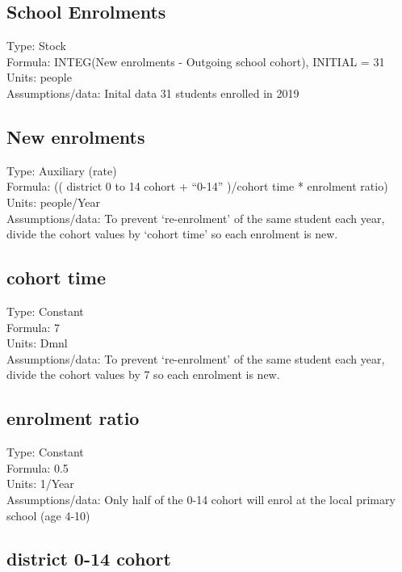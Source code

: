 \documentclass[
  11pt,
]{book}
\begin{document}
\hypertarget{school-enrolments}{%
\subsection{School Enrolments}\label{school-enrolments}}

Type: Stock\\
Formula: INTEG(New enrolments - Outgoing school cohort), INITIAL = 31\\
Units: people\\
Assumptions/data: Inital data 31 students enrolled in 2019

\hypertarget{new-enrolments}{%
\subsection{New enrolments}\label{new-enrolments}}

Type: Auxiliary (rate)\\
Formula: (( district 0 to 14 cohort + ``0-14'' )/cohort time * enrolment ratio)\\
Units: people/Year\\
Assumptions/data: To prevent `re-enrolment' of the same student each year, divide the cohort values by `cohort time' so each enrolment is new.

\hypertarget{cohort-time}{%
\subsection{cohort time}\label{cohort-time}}

Type: Constant\\
Formula: 7\\
Units: Dmnl\\
Assumptions/data: To prevent `re-enrolment' of the same student each year, divide the cohort values by 7 so each enrolment is new.

\hypertarget{enrolment-ratio}{%
\subsection{enrolment ratio}\label{enrolment-ratio}}

Type: Constant\\
Formula: 0.5\\
Units: 1/Year\\
Assumptions/data: Only half of the 0-14 cohort will enrol at the local primary school (age 4-10)

\hypertarget{district-0-14-cohort}{%
\subsection{district 0-14 cohort}\label{district-0-14-cohort}}
\end{document}
